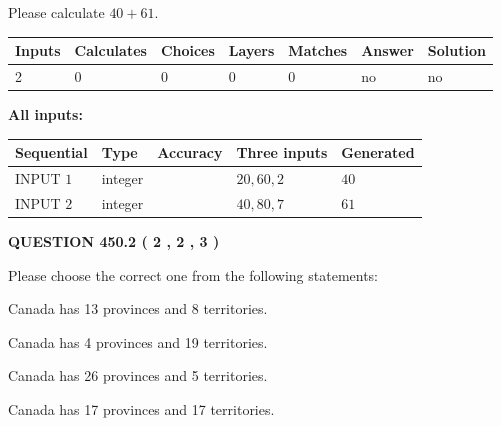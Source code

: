 \documentclass[12pt]{article}
\begin{document}
  
 
Please calculate $ %
40 +  %
61 $.
 
 
   
   
   
   
\noindent\begin{tabular}{|l|l|l|l|l|l|l|}
 \hline
Inputs & Calculates & Choices & Layers & Matches & Answer & Solution \\ \hline
 2  & 
 0  & 
 0
  & 
 0  & 
 0  & 
  no & 
  no 
  \\ \hline
 \end{tabular}
   
   
   
   
\noindent{}
   
   
   
   
\noindent\vspace{0.1in}\hspace{-0.08in} {\textbf{\Large{All inputs: }}}
   
   
  
  
\noindent\begin{tabular}{|l|l|l|l|l|}
\hline
 Sequential & Type & Accuracy & Three inputs & Generated \\ 
\hline
 
 
  INPUT $  1 $ & integer &  & $
 20
 , 
 60
 , 
 2
 $ & $ 40 $ 
 \\  \hline  
 
 
  INPUT $  2 $ & integer &  & $
 40
 , 
 80
 , 
 7
 $ & $ 61 $ 
 \\  \hline  
 \end{tabular}
   
   
  
\vspace{0.2in}
  
{\textbf{\Large{QUESTION
450.2 
 ( 2 , 2 , 3 )
}}}
  
  
Please choose the correct one from the following statements:
 
 
Canada has  13 provinces and  8 territories.
 
 
Canada has   4 provinces and  19 territories.
 
 
Canada has  26 provinces and  5 territories.
 
 
Canada has  17 provinces and  17 territories.
 
\end{document}
